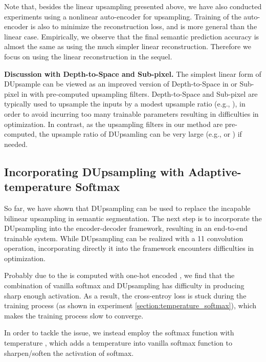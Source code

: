 \documentclass[10pt,twocolumn,letterpaper]{article}
\newcommand{\1}{{\mathbbm{1}}}
\begin{document}
Note that, besides the linear upsampling presented above, we have also
conducted experiments using a nonlinear auto-encoder for upsampling.
Training of the auto-encoder is also to minimize the reconstruction loss,
and is  more general than the linear case. Empirically,
we observe that the final semantic prediction accuracy is almost the same
as using the much simpler linear reconstruction. Therefore we
focus on using the linear reconstruction in the sequel.

\textbf{Discussion with Depth-to-Space and Sub-pixel.} The simplest linear form of DUpsample can be viewed as an improved version of Depth-to-Space in \cite{wojna2017devil} or Sub-pixel in \cite{shi2016real} with pre-computed upsampling filters.
Depth-to-Space and Sub-pixel are typically used to upsample the inputs by a modest upsample ratio (e.g., ), in order to avoid incurring too many trainable parameters resulting in difficulties in optimization.
In contrast, as the upsampling filters in our method are pre-computed, the upsample ratio of DUpsamling can be very large (e.g.,  or ) if needed.











\subsection{Incorporating DUpsampling with Adaptive-temperature Softmax}

So far, we have shown that DUpsampling can be used to replace the incapable bilinear upsampling in semantic segmentation. The next step is to incorporate the DUpsampling into the encoder-decoder framework, resulting in an end-to-end trainable system. While DUpsampling can be realized with a 11 convolution operation, incorporating directly it into the framework encounters difficulties in optimization.

Probably due to the  is computed with one-hot encoded , we find that the combination of vanilla softmax and DUpsampling has difficulty in producing sharp enough activation. As a result, the cross-entroy loss is stuck during the training process (as shown in experiment \ref{section:temperature_softmax}), which makes the training process slow to converge.




In order to tackle the issue, we instead employ the softmax function with temperature \cite{hinton2015distilling}, which adds a temperature  into vanilla softmax function to sharpen/soften the activation of softmax.
\end{document}
